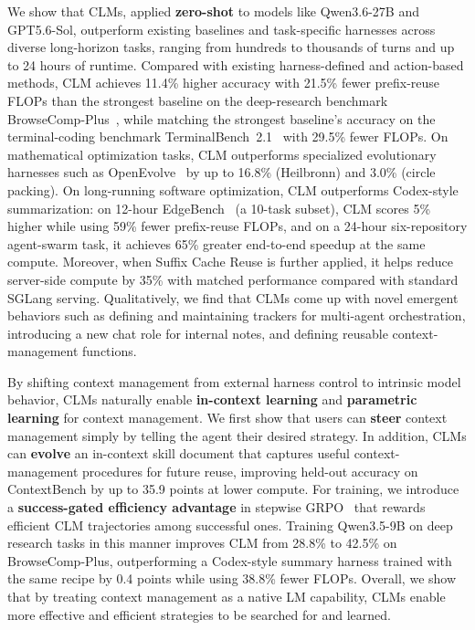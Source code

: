 \documentclass{fairmeta}
\newcommand{\clmhl}[1]{\textcolor{clmblue}{\textbf{#1}}}
\newcommand{\ours}{CLM\xspace}
\newcommand{\oursplural}{CLMs\xspace}
\newcommand{\ourbench}{ContextBench\xspace}
\begin{document}
We show that \oursplural, applied \clmhl{zero-shot} to models like Qwen3.6-27B and GPT5.6-Sol, outperform existing baselines and task-specific harnesses across diverse long-horizon tasks, ranging from hundreds to thousands of turns and up to 24 hours of runtime.
Compared with existing harness-defined and action-based methods, \ours{} achieves 11.4\% higher accuracy with 21.5\% fewer prefix-reuse FLOPs than the strongest baseline on the deep-research benchmark BrowseComp-Plus~\citep{chen2025browsecomp}, while matching the strongest baseline's accuracy on the terminal-coding benchmark TerminalBench~2.1~\citep{merrill2026terminal} with 29.5\% fewer FLOPs.
On mathematical optimization tasks, \ours{} outperforms specialized evolutionary harnesses such as OpenEvolve~\citep{openevolve} by up to 16.8\% (Heilbronn) and 3.0\% (circle packing).
On long-running software optimization, \ours{} outperforms 
Codex-style summarization: on 12-hour EdgeBench~\citep{zhu2026edgebench} (a 10-task subset), \ours{} scores 5\% higher while using 59\% fewer prefix-reuse FLOPs, and on a 24-hour six-repository agent-swarm task, it achieves 65\% greater end-to-end speedup at the same compute.
Moreover, when Suffix Cache Reuse is further applied, it helps reduce server-side compute by 35\% with matched performance compared with standard SGLang serving.
Qualitatively, we find that \oursplural{} come up with novel emergent behaviors such as defining and maintaining trackers for multi-agent orchestration, introducing a new chat role for internal notes, and defining reusable context-management functions.

By shifting context management from external harness control to intrinsic model behavior, \oursplural{} naturally enable \clmhl{in-context learning} and \clmhl{parametric learning} for context management.
We first show that users can \clmhl{steer} context management simply by telling the agent their desired strategy. 
In addition, \oursplural can \clmhl{evolve} an in-context skill document that captures useful context-management procedures for future reuse, 
improving held-out accuracy on \ourbench{} by up to 35.9 points at lower compute.
For training, we introduce a \clmhl{success-gated efficiency advantage} in stepwise GRPO~\citep{shao2024deepseekmath} that rewards efficient \ours{} trajectories among successful ones.
Training Qwen3.5-9B on deep research tasks in this manner  improves \ours{} from 28.8\% to 42.5\% on BrowseComp-Plus, outperforming a Codex-style summary harness trained with the same recipe by 0.4 points while using 38.8\% fewer FLOPs.
Overall, we show that by treating context management as a native LM capability, \oursplural enable more effective and efficient strategies to be searched for and learned.
\end{document}
